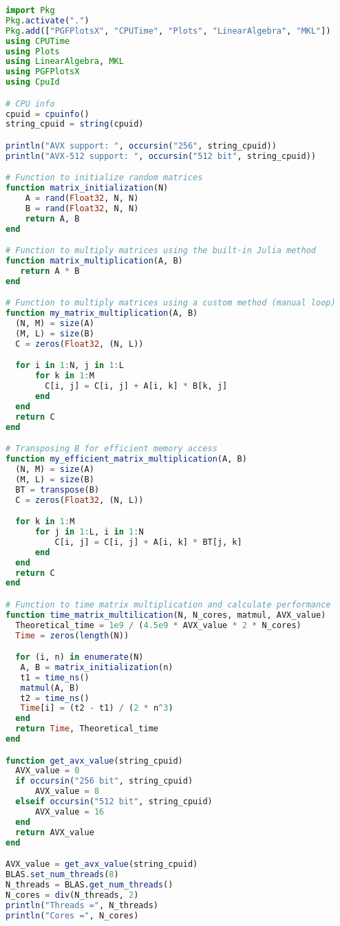 \begin{lstlisting}[language=Julia]
import Pkg
Pkg.activate(".")
Pkg.add(["PGFPlotsX", "CPUTime", "Plots", "LinearAlgebra", "MKL"])
using CPUTime
using Plots
using LinearAlgebra, MKL
using PGFPlotsX
using CpuId

# CPU info
cpuid = cpuinfo()
string_cpuid = string(cpuid)

println("AVX support: ", occursin("256", string_cpuid))
println("AVX-512 support: ", occursin("512 bit", string_cpuid))

# Function to initialize random matrices
function matrix_initialization(N)
    A = rand(Float32, N, N)
    B = rand(Float32, N, N)
    return A, B
end

# Function to multiply matrices using the built-in Julia method
function matrix_multiplication(A, B)
   return A * B  
end

# Function to multiply matrices using a custom method (manual loop)
function my_matrix_multiplication(A, B)
  (N, M) = size(A)
  (M, L) = size(B)
  C = zeros(Float32, (N, L))

  for i in 1:N, j in 1:L
      for k in 1:M
        C[i, j] = C[i, j] + A[i, k] * B[k, j]
      end
  end
  return C
end

# Transposing B for efficient memory access
function my_efficient_matrix_multiplication(A, B)
  (N, M) = size(A)
  (M, L) = size(B)
  BT = transpose(B) 
  C = zeros(Float32, (N, L))

  for k in 1:M
      for j in 1:L, i in 1:N
          C[i, j] = C[i, j] + A[i, k] * BT[j, k]
      end
  end
  return C
end

# Function to time matrix multiplication and calculate performance
function time_matrix_multilication(N, N_cores, matmul, AVX_value)
  Theoretical_time = 1e9 / (4.5e9 * AVX_value * 2 * N_cores)
  Time = zeros(length(N))

  for (i, n) in enumerate(N)
   A, B = matrix_initialization(n)
   t1 = time_ns()
   matmul(A, B)
   t2 = time_ns()
   Time[i] = (t2 - t1) / (2 * n^3)
  end 
  return Time, Theoretical_time
end

function get_avx_value(string_cpuid)
  AVX_value = 0
  if occursin("256 bit", string_cpuid)
      AVX_value = 8
  elseif occursin("512 bit", string_cpuid)
      AVX_value = 16
  end
  return AVX_value
end

AVX_value = get_avx_value(string_cpuid)
BLAS.set_num_threads(8)
N_threads = BLAS.get_num_threads()
N_cores = div(N_threads, 2)
println("Threads =", N_threads) 
println("Cores =", N_cores)


\end{lstlisting}

